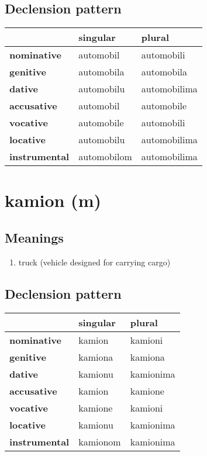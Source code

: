 \subsection*{Declension pattern}
\begin{tabularx}{\linewidth}{Xll}
\toprule
{} &     singular &        plural \\
\midrule
\textbf{nominative  } &    automobil &    automobili \\
\textbf{genitive    } &   automobila &    automobila \\
\textbf{dative      } &   automobilu &  automobilima \\
\textbf{accusative  } &    automobil &    automobile \\
\textbf{vocative    } &   automobile &    automobili \\
\textbf{locative    } &   automobilu &  automobilima \\
\textbf{instrumental} &  automobilom &  automobilima \\
\bottomrule
\end{tabularx}

\filbreak
\section{kamion (m)}
\subsection*{Meanings}
\begin{enumerate}
\item truck (vehicle designed for carrying cargo)
\end{enumerate}
\subsection*{Declension pattern}
\begin{tabularx}{\linewidth}{Xll}
\toprule
{} &  singular &     plural \\
\midrule
\textbf{nominative  } &    kamion &    kamioni \\
\textbf{genitive    } &   kamiona &    kamiona \\
\textbf{dative      } &   kamionu &  kamionima \\
\textbf{accusative  } &    kamion &    kamione \\
\textbf{vocative    } &   kamione &    kamioni \\
\textbf{locative    } &   kamionu &  kamionima \\
\textbf{instrumental} &  kamionom &  kamionima \\
\bottomrule
\end{tabularx}

